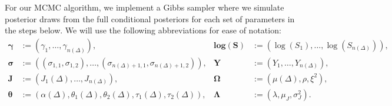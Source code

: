 For our MCMC algorithm, we implement a Gibbs sampler where we simulate posterior draws from the full conditional posteriors for each set of parameters in the steps below. We will use the following abbreviations for ease of notation:
\begin{align*}
  \boldsymbol{\gamma} &:= (\gamma_1, \ldots, \gamma_{n(\Delta)}), & \boldsymbol{\mbox{log}(S)} &:= (\log(S_1), \ldots, \log(S_{n(\Delta)})), \\
  \boldsymbol{\sigma} &:= \left( (\sigma_{1,1},\sigma_{1,2}), \ldots,  (\sigma_{n(\Delta)+1,1}, \sigma_{n(\Delta)+1, 2}) \right), & \boldsymbol{Y} &:= (Y_1, \ldots, Y_{n(\Delta)}), \\
  \boldsymbol{J} &:= (J_1(\Delta), \ldots, J_{n(\Delta)}), & \boldsymbol{\Omega} &:= (\mu(\Delta), \rho, \xi^2), \\
  \boldsymbol{\theta} &:= (\alpha(\Delta), \theta_1(\Delta), \theta_2(\Delta), \tau_1(\Delta), \tau_2(\Delta)), & \boldsymbol{\Lambda} &:= (\lambda, \mu_J, \sigma_J^2).
\end{align*}
